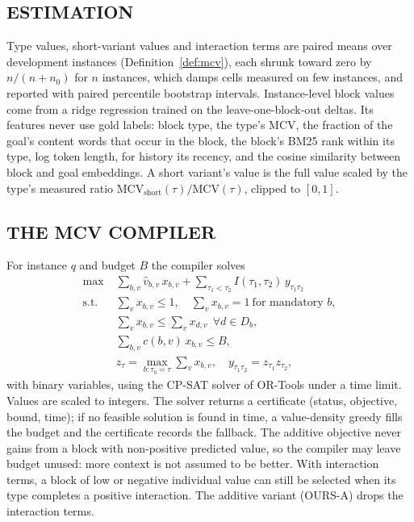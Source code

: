 \subsection{ESTIMATION}
Type values, short-variant values and interaction terms are paired means over development instances (Definition~\ref{def:mcv}), each
shrunk toward zero by $n/(n+n_0)$ for $n$ instances, which damps cells measured on few instances, and reported with
paired percentile bootstrap intervals. Instance-level block values come from a ridge regression trained on the
leave-one-block-out deltas. Its features never use gold labels: block type, the type's MCV, the fraction of the goal's
content words that occur in the block, the block's BM25 rank within its type, log token length, for history its
recency, and the cosine similarity between block and goal embeddings. A short variant's value is the full value scaled by the type's measured ratio
$\mathrm{MCV}_{\mathrm{short}}(\tau)/\mathrm{MCV}(\tau)$, clipped to $[0,1]$.

\subsection{THE MCV COMPILER}
For instance $q$ and budget $B$ the compiler solves
\begin{align*}
\max\;&\textstyle\sum_{b,v}\hat v_{b,v}\,x_{b,v}+\sum_{\tau_1<\tau_2}I(\tau_1,\tau_2)\,y_{\tau_1\tau_2}\\
\text{s.t.}\;&\textstyle\sum_v x_{b,v}\le 1,\quad \sum_v x_{b,v}=1\ \text{for mandatory } b,\\
&\textstyle\sum_v x_{b,v}\le\sum_v x_{d,v}\ \ \forall d\in D_b,\\
&\textstyle\sum_{b,v}c(b,v)\,x_{b,v}\le B,\\
&z_\tau=\max_{b:\tau_b=\tau}\textstyle\sum_v x_{b,v},\quad y_{\tau_1\tau_2}=z_{\tau_1}z_{\tau_2},
\end{align*}
with binary variables, using the CP-SAT solver of OR-Tools under a time limit. Values are scaled to integers. The solver
returns a certificate (status, objective, bound, time); if no feasible solution is found in time, a value-density greedy
fills the budget and the certificate records the fallback. The additive objective never gains from a block with non-positive predicted value, so the compiler may leave budget
unused: more context is not assumed to be better. With interaction terms, a block of low or negative individual value
can still be selected when its type completes a positive interaction. The additive variant (OURS-A) drops
the interaction terms.

